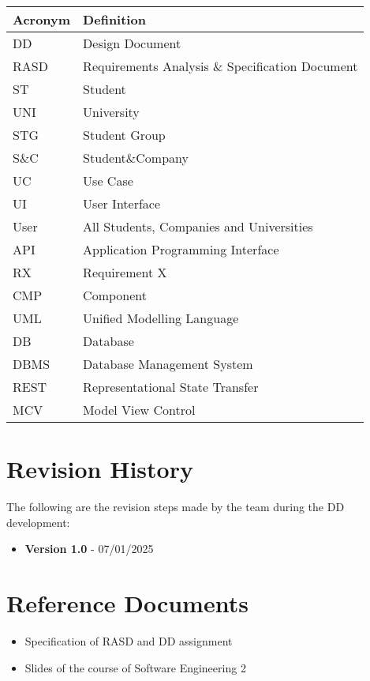 \begin{longtable}{|l|l|}
    \hline
    \textbf{Acronym} & \textbf{Definition} \\
    \hline
    DD & Design Document \\
    \hline
    RASD & Requirements Analysis \& Specification Document \\
    \hline
    ST & Student \\
    \hline
    UNI & University \\
    \hline
    STG & Student Group \\
    \hline
    S\&C & Student\&Company \\
    \hline
    UC & Use Case \\
    \hline
    UI & User Interface\\
    \hline
    User & All Students, Companies and Universities \\
    \hline
    API & Application Programming Interface \\
    \hline
    RX & Requirement X \\
    \hline
    CMP & Component \\
    \hline 
    UML & Unified Modelling Language \\
    \hline
    DB & Database \\
    \hline
    DBMS & Database Management System \\
    \hline
     REST & Representational State Transfer \\
     \hline
     MCV & Model View Control \\
    \hline
\end{longtable}

\section{ Revision History}

 The following are the revision steps made by the team during the DD development:

 \begin{itemize}
     \item \textbf{Version 1.0} - 07/01/2025
 \end{itemize}

\section{ Reference Documents}

\begin{itemize}
    \item Specification of RASD and DD assignment
    \item  Slides of the course of Software Engineering 2
\end{itemize}

